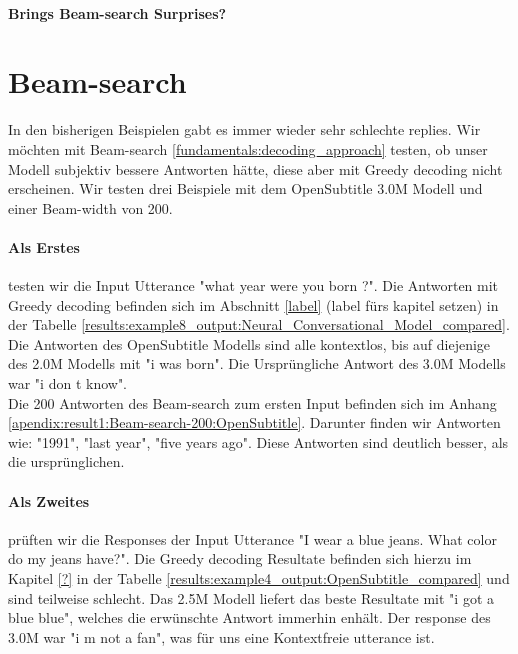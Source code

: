 \paragraph{Brings Beam-search Surprises?}

\section{Beam-search}
In den bisherigen Beispielen gabt es immer wieder sehr schlechte replies. Wir möchten mit Beam-search \ref{fundamentals:decoding_approach} testen, ob unser Modell subjektiv bessere Antworten hätte, diese aber mit Greedy decoding nicht erscheinen. Wir testen drei Beispiele mit dem OpenSubtitle 3.0M Modell und einer Beam-width von 200.


\paragraph{Als Erstes} testen wir die Input Utterance "what year were you born ?". Die Antworten mit Greedy decoding befinden sich im Abschnitt \ref{label} (label fürs kapitel setzen) in der Tabelle \ref{results:example8_output:Neural_Conversational_Model_compared}. Die Antworten des OpenSubtitle Modells sind alle kontextlos, bis auf diejenige des 2.0M Modells mit "i was born". Die Ursprüngliche Antwort des 3.0M Modells war "i don t know".\\

Die 200 Antworten des Beam-search zum ersten Input befinden sich im Anhang \ref{apendix:result1:Beam-search-200:OpenSubtitle}. Darunter finden wir Antworten wie: "1991", "last year", "five years ago". Diese Antworten sind deutlich besser, als die ursprünglichen.

\paragraph{Als Zweites} prüften wir die Responses der Input Utterance "I wear a blue jeans. What color do my jeans have?". Die Greedy decoding Resultate befinden sich hierzu im Kapitel \ref{?} in der Tabelle \ref{results:example4_output:OpenSubtitle_compared} und sind teilweise schlecht. Das 2.5M Modell liefert das beste Resultate mit "i got a blue blue", welches die erwünschte Antwort immerhin enhält. Der response des 3.0M war "i m not a fan", was für uns eine Kontextfreie utterance ist.\\

